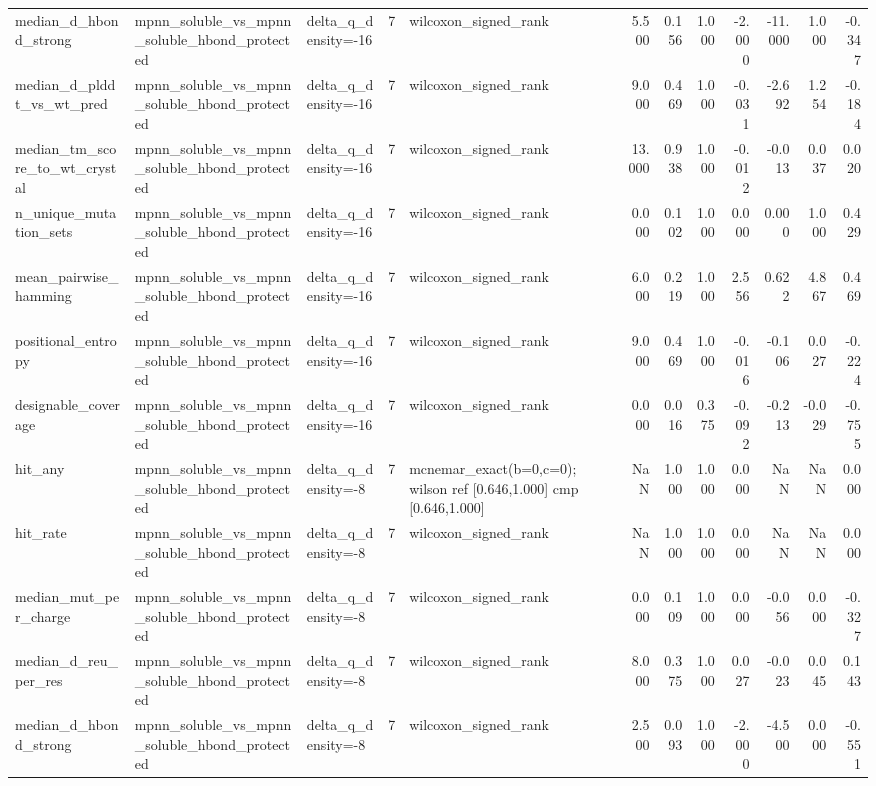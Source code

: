 \begin{table}
{\begin{tabular}{lllrlrrrrrrr}
median\_d\_hbond\_strong & mpnn\_soluble\_vs\_mpnn\_soluble\_hbond\_protected & delta\_q\_density=-16 & 7 & wilcoxon\_signed\_rank & 5.500 & 0.156 & 1.000 & -2.000 & -11.000 & 1.000 & -0.347 \\
median\_d\_plddt\_vs\_wt\_pred & mpnn\_soluble\_vs\_mpnn\_soluble\_hbond\_protected & delta\_q\_density=-16 & 7 & wilcoxon\_signed\_rank & 9.000 & 0.469 & 1.000 & -0.031 & -2.692 & 1.254 & -0.184 \\
median\_tm\_score\_to\_wt\_crystal & mpnn\_soluble\_vs\_mpnn\_soluble\_hbond\_protected & delta\_q\_density=-16 & 7 & wilcoxon\_signed\_rank & 13.000 & 0.938 & 1.000 & -0.012 & -0.013 & 0.037 & 0.020 \\
n\_unique\_mutation\_sets & mpnn\_soluble\_vs\_mpnn\_soluble\_hbond\_protected & delta\_q\_density=-16 & 7 & wilcoxon\_signed\_rank & 0.000 & 0.102 & 1.000 & 0.000 & 0.000 & 1.000 & 0.429 \\
mean\_pairwise\_hamming & mpnn\_soluble\_vs\_mpnn\_soluble\_hbond\_protected & delta\_q\_density=-16 & 7 & wilcoxon\_signed\_rank & 6.000 & 0.219 & 1.000 & 2.556 & 0.622 & 4.867 & 0.469 \\
positional\_entropy & mpnn\_soluble\_vs\_mpnn\_soluble\_hbond\_protected & delta\_q\_density=-16 & 7 & wilcoxon\_signed\_rank & 9.000 & 0.469 & 1.000 & -0.016 & -0.106 & 0.027 & -0.224 \\
designable\_coverage & mpnn\_soluble\_vs\_mpnn\_soluble\_hbond\_protected & delta\_q\_density=-16 & 7 & wilcoxon\_signed\_rank & 0.000 & 0.016 & 0.375 & -0.092 & -0.213 & -0.029 & -0.755 \\
hit\_any & mpnn\_soluble\_vs\_mpnn\_soluble\_hbond\_protected & delta\_q\_density=-8 & 7 & mcnemar\_exact(b=0,c=0); wilson ref [0.646,1.000] cmp [0.646,1.000] & NaN & 1.000 & 1.000 & 0.000 & NaN & NaN & 0.000 \\
hit\_rate & mpnn\_soluble\_vs\_mpnn\_soluble\_hbond\_protected & delta\_q\_density=-8 & 7 & wilcoxon\_signed\_rank & NaN & 1.000 & 1.000 & 0.000 & NaN & NaN & 0.000 \\
median\_mut\_per\_charge & mpnn\_soluble\_vs\_mpnn\_soluble\_hbond\_protected & delta\_q\_density=-8 & 7 & wilcoxon\_signed\_rank & 0.000 & 0.109 & 1.000 & 0.000 & -0.056 & 0.000 & -0.327 \\
median\_d\_reu\_per\_res & mpnn\_soluble\_vs\_mpnn\_soluble\_hbond\_protected & delta\_q\_density=-8 & 7 & wilcoxon\_signed\_rank & 8.000 & 0.375 & 1.000 & 0.027 & -0.023 & 0.045 & 0.143 \\
median\_d\_hbond\_strong & mpnn\_soluble\_vs\_mpnn\_soluble\_hbond\_protected & delta\_q\_density=-8 & 7 & wilcoxon\_signed\_rank & 2.500 & 0.093 & 1.000 & -2.000 & -4.500 & 0.000 & -0.551 \\

\end{tabular}}
\end{table}
